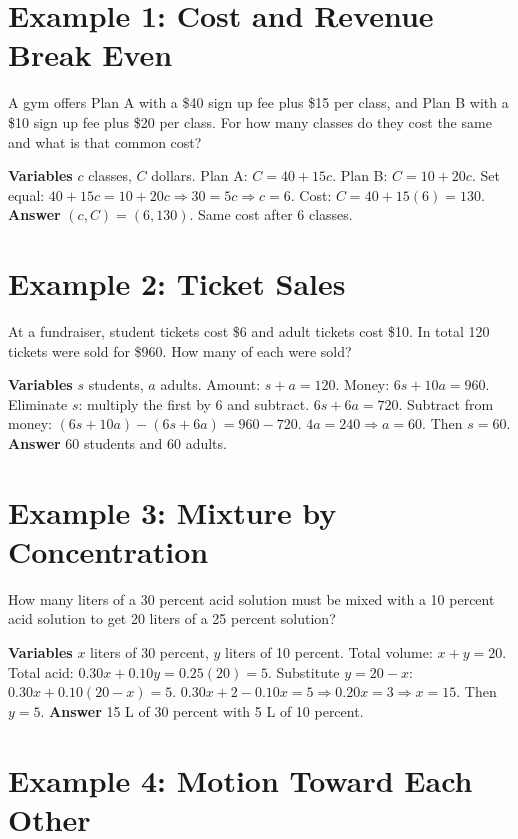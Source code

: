 \documentclass[12pt]{article}
\begin{document}
\section*{Example 1: Cost and Revenue Break Even}

A gym offers Plan A with a \$40 sign up fee plus \$15 per class, and Plan B with a \$10 sign up fee plus \$20 per class. For how many classes do they cost the same and what is that common cost?

\textbf{Variables} \(c\) classes, \(C\) dollars.  
Plan A: \(C = 40 + 15c\). Plan B: \(C = 10 + 20c\).  
Set equal: \(40 + 15c = 10 + 20c \Rightarrow 30 = 5c \Rightarrow c = 6\).  
Cost: \(C = 40 + 15(6) = 130\).  
\textbf{Answer} \((c, C) = (6, 130)\). Same cost after 6 classes.

\section*{Example 2: Ticket Sales}

At a fundraiser, student tickets cost \$6 and adult tickets cost \$10. In total 120 tickets were sold for \$960. How many of each were sold?

\textbf{Variables} \(s\) students, \(a\) adults.  
Amount: \(s + a = 120\). Money: \(6s + 10a = 960\).  
Eliminate \(s\): multiply the first by 6 and subtract.  
\(6s + 6a = 720\). Subtract from money: \((6s + 10a) - (6s + 6a) = 960 - 720\).  
\(4a = 240 \Rightarrow a = 60\). Then \(s = 60\).  
\textbf{Answer} 60 students and 60 adults.

\section*{Example 3: Mixture by Concentration}

How many liters of a 30 percent acid solution must be mixed with a 10 percent acid solution to get 20 liters of a 25 percent solution?

\textbf{Variables} \(x\) liters of 30 percent, \(y\) liters of 10 percent.  
Total volume: \(x + y = 20\).  
Total acid: \(0.30x + 0.10y = 0.25(20) = 5\).  
Substitute \(y = 20 - x\): \(0.30x + 0.10(20 - x) = 5\).  
\(0.30x + 2 - 0.10x = 5 \Rightarrow 0.20x = 3 \Rightarrow x = 15\).  
Then \(y = 5\).  
\textbf{Answer} 15 L of 30 percent with 5 L of 10 percent.

\section*{Example 4: Motion Toward Each Other}
\end{document}
